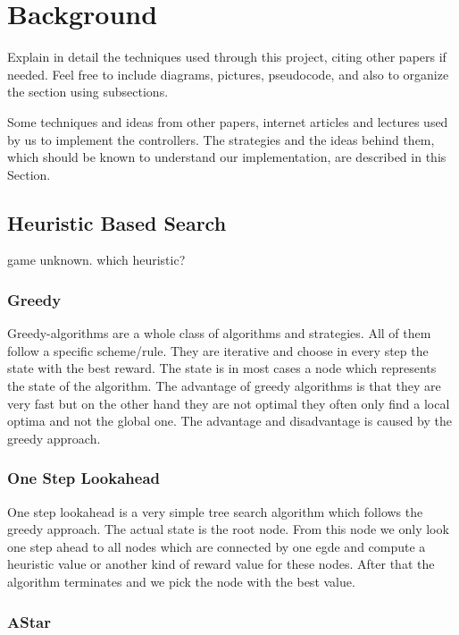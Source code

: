 

\section{Background} \label{sec:back}

Explain in detail the techniques used through this project, citing other papers if needed. Feel free to include diagrams, pictures, pseudocode, and also to organize the section using subsections.

Some techniques and ideas from other papers, internet articles and lectures used by us to implement the controllers. The strategies and the ideas behind them, which should be known to understand our implementation, are described in this Section. 

\subsection{Heuristic Based Search} 


game unknown. which heuristic?
~\cite{DesurvireCT04}


\subsubsection{Greedy}

Greedy-algorithms are a whole class of algorithms and strategies. All of them follow a specific scheme/rule. They are iterative and choose in every step the state with the best reward. The state is in most cases a node which represents the state of the algorithm. The advantage of greedy algorithms is that they are very fast but on the other hand they are not optimal they often only find a local optima and not the global one. The advantage and disadvantage is caused by the greedy approach.  

\subsubsection{One Step Lookahead}

One step lookahead is a very simple tree search algorithm which follows the greedy approach. The actual state is the root node. From this node we only look one step ahead to all nodes which are connected by one egde and compute a heuristic value or another kind of reward value for these nodes. After that the algorithm terminates and we pick the node with the best value.

\subsubsection{AStar}

